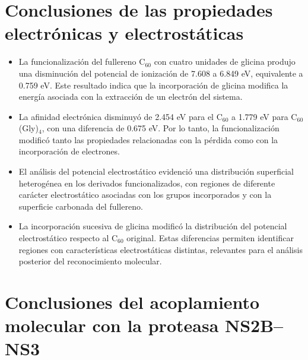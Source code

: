 \section{Conclusiones de las propiedades electrónicas
y electrostáticas}

\begin{itemize}

    \item La funcionalización del fullereno C$_{60}$
    con cuatro unidades de glicina produjo una
    disminución del potencial de ionización de
    7.608 a 6.849 eV, equivalente a 0.759 eV.
    Este resultado indica que la incorporación
    de glicina modifica la energía asociada
    con la extracción de un electrón del sistema.

    \item La afinidad electrónica disminuyó de
    2.454 eV para el C$_{60}$ a 1.779 eV para
    C$_{60}$(Gly)$_4$, con una diferencia de
    0.675 eV. Por lo tanto, la funcionalización
    modificó tanto las propiedades relacionadas
    con la pérdida como con la incorporación
    de electrones.

    \item El análisis del potencial electrostático
    evidenció una distribución superficial
    heterogénea en los derivados funcionalizados,
    con regiones de diferente carácter
    electrostático asociadas con los grupos
    incorporados y con la superficie carbonada
    del fullereno.

    \item La incorporación sucesiva de glicina
    modificó la distribución del potencial
    electrostático respecto al C$_{60}$ original.
    Estas diferencias permiten identificar
    regiones con características electrostáticas
    distintas, relevantes para el análisis
    posterior del reconocimiento molecular.

\end{itemize}

\section{Conclusiones del acoplamiento molecular
con la proteasa NS2B--NS3}

